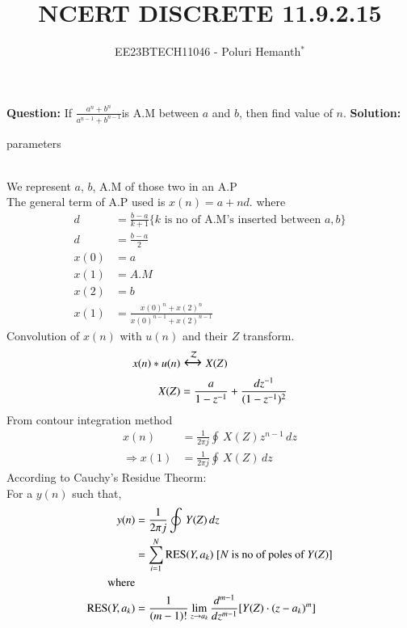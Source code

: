 \documentclass[journal,12pt,twocolumn]{IEEEtran}
\theoremstyle{remark}
\begin{document}

\vspace{3cm}


\title{NCERT DISCRETE 11.9.2.15}
\author{EE23BTECH11046 - Poluri Hemanth$^{*}$}
\maketitle
\textbf{Question:}
If \( \frac{a^n +b^n}{a^{n-1} + b^{n-1}}\)is A.M between $a$ and $b$, then find value of $n$.
\break
\textbf{Solution:}
\begin{table}[h!]
        
        \caption{parameters}
\end{table}
\\
We represent $a$, $b$, A.M of those two in an A.P\\
The general term of A.P used is $x(n)=a+nd$. where
\begin{align}
	 d&=\frac{b-a}{k+1}\{k\text{ is no of A.M's inserted between }a ,b\}\\
	 d&=\frac{b-a}{2}\label{0}\\
	x(0)&=a\label{a}\\
	x(1)&=A.M\\
	x(2)&=b\label{b}\\
	x(1)&=\frac{x(0)^n +x(2)^n}{x(0)^{n-1} + x(2)^{n-1}}\label{r} 
\end{align}
Convolution of $x(n)$ with $u(n)$ and their $Z$ transform.
\begin{align}
	x(n)*u(n)&\Large\xleftrightarrow{\mathcal{Z}}X(Z)\\
	X(Z)&=\frac{a}{1-z^{-1}}+\frac{dz^{-1}}{(1-z^{-1})^2}\label{7}\\
\end{align}
From contour integration method
\begin{align}
	x(n)&=\frac{1}{2\pi j}\oint\,X(Z)z^{n-1}\,dz\\
	\Rightarrow x(1)&=\frac{1}{2\pi j}\oint\,X(Z)\,dz
\end{align}
According to Cauchy's Residue Theorm:\\
For a $y(n)$ such that, \\
\begin{align}
	y(n)&=\frac{1}{2\pi j}\oint\,Y(Z)\,dz\\
	&=\sum\limits_{i=1}^N\text{RES}(Y,a_k) \text{  [$N$ is no of poles of $Y(Z)$]}\\
	\notag\text{where}\\
	\text{RES}(Y,a_k)&=\frac{1}{(m-1)!}\lim_{z\to a_k}\frac{d^{m-1}}{dz^{m-1}}[Y(Z)\cdot(z-a_k)^{m}]
\end{align}
\end{document}
